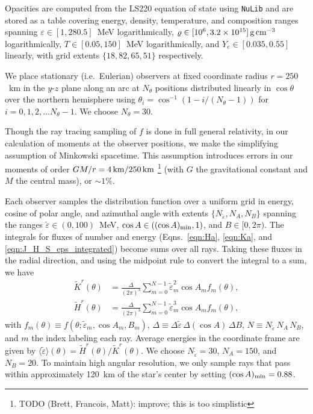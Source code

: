 \documentclass[aps,floatfix,prd,superscriptaddress,twocolumn]{revtex4-1}
\begin{document}
Opacities are computed from the LS220 equation of state using
\lstinline{NuLib} and are stored as a table covering
energy, density, temperature, and composition ranges
spanning $\varepsilon\in[1,280.5]$~MeV logarithmically,
$\varrho\in[10^6,3.2\times10^{15}]\,{\rm g}\,{\rm cm}^{-3}$ logarithmically,
$T\in[0.05,150]$~MeV logarithmically, and 
$Y_e\in[0.035,0.55]$ linearly,
with grid extents $\{18,82,65,51\}$ respectively.

We place stationary (i.e.\ Eulerian) observers at fixed coordinate radius
$r=250$~km in the $y$-$z$ plane along an arc at $N_\theta$ positions
distributed linearly in $\cos\theta$ over the northern hemisphere
using $\theta_i=\cos^{-1}\left(1-i/(N_\theta-1)\right)$
for $i=0,1,2,\ldots N_\theta-1$.
We choose $N_\theta=30$.

Though the ray tracing sampling of $f$ is done in full general relativity,
in our calculation of moments at the observer positions,
we make the simplifying assumption of Minkowski spacetime.
This assumption introduces errors in our moments of order
$GM/r=4\,{\rm km}/250\,{\rm km}$
\footnote{TODO (Brett, Francois, Matt): improve; this is too simplistic}
(with $G$ the gravitational constant and $M$ the central mass),
or $\sim 1\%$.

Each observer samples the distribution function over a uniform grid
in energy, cosine of polar angle, and azimuthal angle with extents
$\{N_{\tilde{\varepsilon}},N_A, N_B\}$ spanning the ranges
$\tilde{\varepsilon}\in(0,100)$~MeV,
$\cos A\in\left((\cos A)_{\rm min}, 1\right)$, and
$B\in[0,2\pi)$.
The integrals for fluxes of number and energy
(Eqns.~\ref{eqn:Ha}, \ref{eqn:Ka}, and \ref{eqn:J_H_S_eps_integrated})
become sums over all rays.
Taking these fluxes in the radial direction,
and using the midpoint rule to convert the integral to a sum, we have
\begin{align}
  \label{eqn:Kr_minkowski}
  \tilde{K}^r(\theta) &= \frac{\Delta}{(2\pi)^3}
  \sum\limits_{m=0}^{N-1}
  \tilde{\varepsilon}_m^2 \cos A_m f_m(\theta),\\
  \label{eqn:Hr_minkowski}
  \tilde{H}^r(\theta) &= \frac{\Delta}{(2\pi)^3}
  \sum\limits_{m=0}^{N-1}
  \tilde{\varepsilon}_m^3 \cos A_m f_m(\theta),
\end{align}
with $f_m(\theta) \equiv f(\theta;\tilde{\varepsilon}_m,\cos A_m, B_m)$,
$\Delta \equiv \Delta\tilde{\varepsilon}\, \Delta(\cos A)\, \Delta B$,
$N \equiv N_{\tilde{\varepsilon}}\, N_A\, N_B$,
and $m$ the index labeling each ray.
Average energies in the coordinate frame are given by
$\langle\tilde{\varepsilon}\rangle(\theta)=\tilde{H}^r(\theta)/\tilde{K}^r(\theta)$.
We choose $N_{\tilde{\varepsilon}}=30$, $N_A=150$, and $N_B=20$.
To maintain high angular resolution, we only sample rays that pass within
approximately 120~km of the star's center by setting $(\cos A)_{\rm min}=0.88$.
\end{document}
